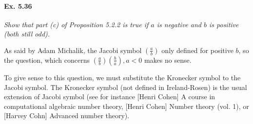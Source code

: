 \documentclass[11pt,a4paper]{article}
\newcommand{\legendre}[2]{\genfrac{(}{)}{}{}{#1}{#2}}
\begin{document}
\paragraph{Ex. 5.36}

{\it Show that part (c) of Proposition 5.2.2 is true if $a$ is negative and $b$ is positive (both still odd).
}

\bigskip

As said by Adam Michalik, the Jacobi symbol $\legendre{a}{b}$ only defined for positive $b$, so the question, which concerns $\legendre{a}{b} \legendre{b}{a}, a<0$ makes no sense.

To give sense to this question, we must substitute the Kronecker symbol to the Jacobi symbol. The Kronecker symbol (not defined in Ireland-Rosen) is the usual extension of Jacobi symbol (see for instance [Henri Cohen] A course in computational algebraic number theory, [Henri Cohen] Number theory (vol. 1), or [Harvey Cohn] Advanced number theory).
\end{document}
